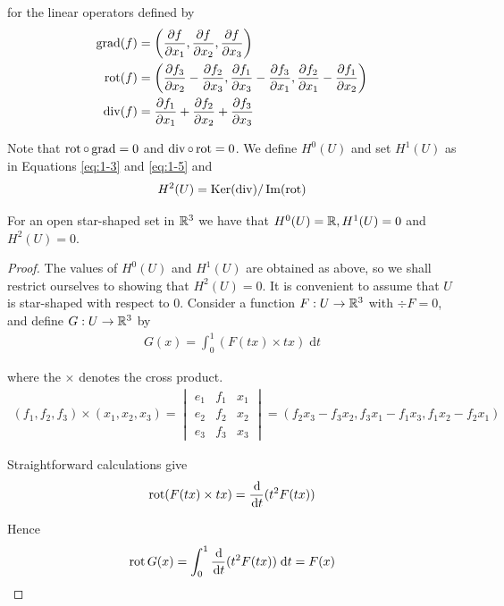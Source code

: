for the linear operators defined by
\begin{align*}
  \operatorname{grad}(f) & = \left(\frac{\partial f}{\partial x_1}, \frac{\partial f}{\partial x_2}, \frac{\partial f}{\partial x_3}\right) \\
  \operatorname{rot}(f) & = \left(\frac{\partial f_3}{\partial x_2} - \frac{\partial f_2}{\partial x_3}, \frac{\partial f_1}{\partial x_3} - \frac{\partial f_3}{\partial x_1}, \frac{\partial f_2}{\partial x_1} - \frac{\partial f_1}{\partial x_2}\right) \\
  \operatorname{div}(f) & = \frac{\partial f_1}{\partial x_1} + \frac{\partial f_2}{\partial x_2} + \frac{\partial f_3}{\partial x_3}
\end{align*}

Note that $\operatorname{rot}\circ\operatorname{grad} = 0$ and $\operatorname{div}\circ\operatorname{rot} = 0$. We define $H^0(U)$ and set $H^1(U)$ as in 
Equations \eqref{eq:1-3} and \eqref{eq:1-5} and
\begin{align}\label{eq:1-6}
  H^2(U) = \operatorname{Ker}(\operatorname{div})/\operatorname{Im}(\operatorname{rot})
\end{align}


\begin{theorem}\label{theorem:1-6}
  For an open star-shaped set in ${\mathbb{R}}^3$ we have that $H^0(U) = {\mathbb{R}}, H^1(U) = 0$ and $H^2(U) = 0$.
\end{theorem}

\begin{proof}
  The values of $H^0(U)$ and $H^1(U)$ are obtained as above, so we shall
restrict ourselves to showing that $H^2(U) = 0$. It is convenient to assume that $U$
is star-shaped with respect to 0. Consider a function $F:U\to{\ensuremath{\mathbb{R}}}^3$ with $\div F = 0$,
and define $G:U\to{\ensuremath{\mathbb{R}}}^3$ by 
\begin{align*}
  G(x) = \int_{0}^{1}{(F(tx)\times tx ) \;\mathrm{d}t}
\end{align*}

where the $\times$ denotes the cross product.
\begin{align*}
  (f_1, f_2, f_3)\times (x_1, x_2, x_3) 
  = \begin{vmatrix}
      e_1 & f_1 & x_1 \\
      e_2 & f_2 & x_2 \\
      e_3 & f_3 & x_3
    \end{vmatrix}
  = (f_2x_3 - f_3x_2, f_3x_1 - f_1x_3, f_1x_2 - f_2x_1)
\end{align*}

Straightforward calculations give
\begin{align*}
  \rot(F(tx)\times tx) = \frac{\dd }{\dd t} (t^2F(tx))
\end{align*}

Hence
\begin{align*}
  \rot G(x) 
  = \int_{0}^{1}{\frac{\dd }{\dd t} (t^2F(tx)) \;\mathrm{d}t} 
  = F(x)
\end{align*}
\end{proof}

